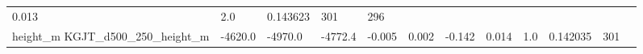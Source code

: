 \documentclass[11pt]{article}
\begin{document}
\begin{longtable}[]{@{}llllllllllll@{}}
\begin{minipage}[t]{0.04\columnwidth}
0.013\strut
\end{minipage} & \begin{minipage}[t]{0.05\columnwidth}\raggedright\strut
2.0\strut
\end{minipage} & \begin{minipage}[t]{0.05\columnwidth}\raggedright\strut
0.143623\strut
\end{minipage} & \begin{minipage}[t]{0.05\columnwidth}\raggedright\strut
301\strut
\end{minipage} & \begin{minipage}[t]{0.07\columnwidth}\raggedright\strut
296\strut
\end{minipage}\tabularnewline
\begin{minipage}[t]{0.18\columnwidth}\raggedright\strut
height\_m KGJT\_d500\_250\_height\_m\strut
\end{minipage} & \begin{minipage}[t]{0.04\columnwidth}\raggedright\strut
-4620.0\strut
\end{minipage} & \begin{minipage}[t]{0.04\columnwidth}\raggedright\strut
-4970.0\strut
\end{minipage} & \begin{minipage}[t]{0.04\columnwidth}\raggedright\strut
-4772.4\strut
\end{minipage} & \begin{minipage}[t]{0.04\columnwidth}\raggedright\strut
-0.005\strut
\end{minipage} & \begin{minipage}[t]{0.05\columnwidth}\raggedright\strut
0.002\strut
\end{minipage} & \begin{minipage}[t]{0.04\columnwidth}\raggedright\strut
-0.142\strut
\end{minipage} & \begin{minipage}[t]{0.04\columnwidth}\raggedright\strut
0.014\strut
\end{minipage} & \begin{minipage}[t]{0.05\columnwidth}\raggedright\strut
1.0\strut
\end{minipage} & \begin{minipage}[t]{0.05\columnwidth}\raggedright\strut
0.142035\strut
\end{minipage} & \begin{minipage}[t]{0.05\columnwidth}\raggedright\strut
301\strut
\end{minipage} & \begin{minipage}[t]{0.07\columnwidth}\raggedright\strut

\end{minipage}
\end{longtable}
\end{document}
